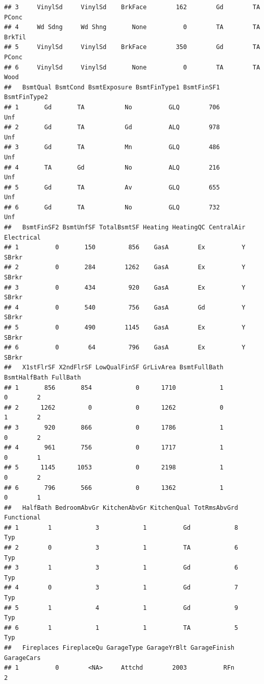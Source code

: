 \documentclass[
]{article}
\begin{document}
\begin{verbatim}
## 3     VinylSd     VinylSd    BrkFace        162        Gd        TA      PConc
## 4     Wd Sdng     Wd Shng       None          0        TA        TA     BrkTil
## 5     VinylSd     VinylSd    BrkFace        350        Gd        TA      PConc
## 6     VinylSd     VinylSd       None          0        TA        TA       Wood
##   BsmtQual BsmtCond BsmtExposure BsmtFinType1 BsmtFinSF1 BsmtFinType2
## 1       Gd       TA           No          GLQ        706          Unf
## 2       Gd       TA           Gd          ALQ        978          Unf
## 3       Gd       TA           Mn          GLQ        486          Unf
## 4       TA       Gd           No          ALQ        216          Unf
## 5       Gd       TA           Av          GLQ        655          Unf
## 6       Gd       TA           No          GLQ        732          Unf
##   BsmtFinSF2 BsmtUnfSF TotalBsmtSF Heating HeatingQC CentralAir Electrical
## 1          0       150         856    GasA        Ex          Y      SBrkr
## 2          0       284        1262    GasA        Ex          Y      SBrkr
## 3          0       434         920    GasA        Ex          Y      SBrkr
## 4          0       540         756    GasA        Gd          Y      SBrkr
## 5          0       490        1145    GasA        Ex          Y      SBrkr
## 6          0        64         796    GasA        Ex          Y      SBrkr
##   X1stFlrSF X2ndFlrSF LowQualFinSF GrLivArea BsmtFullBath BsmtHalfBath FullBath
## 1       856       854            0      1710            1            0        2
## 2      1262         0            0      1262            0            1        2
## 3       920       866            0      1786            1            0        2
## 4       961       756            0      1717            1            0        1
## 5      1145      1053            0      2198            1            0        2
## 6       796       566            0      1362            1            0        1
##   HalfBath BedroomAbvGr KitchenAbvGr KitchenQual TotRmsAbvGrd Functional
## 1        1            3            1          Gd            8        Typ
## 2        0            3            1          TA            6        Typ
## 3        1            3            1          Gd            6        Typ
## 4        0            3            1          Gd            7        Typ
## 5        1            4            1          Gd            9        Typ
## 6        1            1            1          TA            5        Typ
##   Fireplaces FireplaceQu GarageType GarageYrBlt GarageFinish GarageCars
## 1          0        <NA>     Attchd        2003          RFn          2

\end{verbatim}
\end{document}
